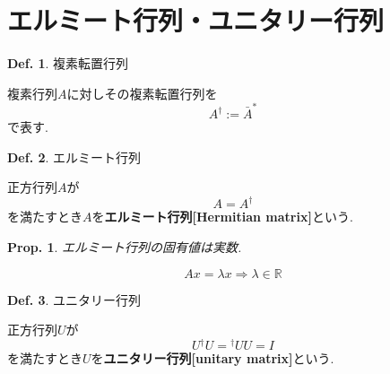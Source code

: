 \documentclass[a4paper,10pt,report]{amsart}
\theoremstyle{plain}
\newtheorem{prop}{Prop.}[section]
\theoremstyle{definition}
\newtheorem{defn}{Def.}[section]
\theoremstyle{remark}
\begin{document}
\part{エルミート行列・ユニタリー行列}
\begin{leftbar}
    \begin{defn}複素転置行列\par
        複素行列\(A \)に対しその複素転置行列を
        \begin{equation}
            A^{\dagger}:=\bar{A}^{*}
        \end{equation}
        で表す. 
    \end{defn}
\end{leftbar}
\begin{leftbar}
    \begin{defn}エルミート行列\par
        正方行列\(A\)が
        \begin{equation}
            A=A^{\dagger}
        \end{equation}
        を満たすとき\(A\)を\textbf{エルミート行列[Hermitian matrix]}という. 
    \end{defn}
\end{leftbar}
\begin{leftbar}
    \begin{prop}エルミート行列の固有値は実数. \par
        \begin{equation}
            Ax=\lambda x\Rightarrow \lambda\in\mathbb{R}
        \end{equation}
    \end{prop}
\end{leftbar}
\begin{leftbar}
    \begin{defn}ユニタリー行列\par
        正方行列\(U\)が
        \begin{equation}
            U{}^{\dagger}U={}^{\dagger}UU=I
        \end{equation}
        を満たすとき\(U\)を\textbf{ユニタリー行列[unitary matrix]}という. 
    \end{defn}
\end{leftbar}
\end{document}
